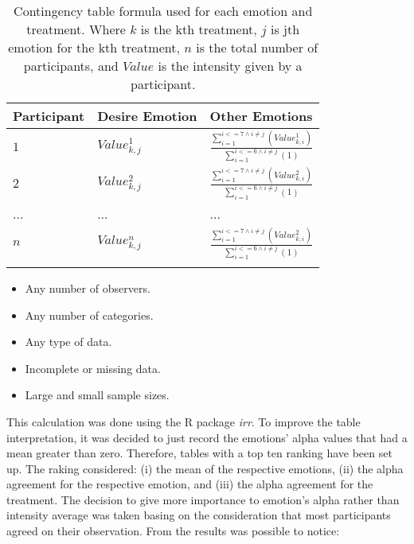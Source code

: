 \begin{table}
\caption{Contingency table formula used for each emotion and treatment. Where $k$ is the kth treatment, $j$ is jth emotion for the kth treatment, $n$ is the total number of participants, and $Value$ is the intensity given by a participant.}
\label{table:table_contingency}
\small
\begin{tabular}{|l|l|l|}
\hline
Participant & Desire Emotion & Other Emotions \\
\hline
$1$ & $Value_{k,j}^{1}$  & $\frac{\sum_{i=1}^{i<=7 \wedge i \neq j}(Value_{k,i}^{1})}{\sum_{i=1}^{i<=6 \wedge i \neq j}(1)}$\\
\hline
$2$ & $Value_{k,j}^{2}$ & $\frac{\sum_{i=1}^{i<=7 \wedge i \neq j}(Value_{k,i}^{2})}{\sum_{i=1}^{i<=6 \wedge i \neq j}(1)}$\\
\hline
... & ... & ...\\
\hline
$n$ & $Value_{k,j}^{n}$ & $\frac{\sum_{i=1}^{i<=7 \wedge i \neq j}(Value_{k,i}^{2})}{\sum_{i=1}^{i<=6 \wedge i \neq j}(1)}$\\
\hline
\multicolumn{3}{c}{}
\end{tabular}
\end{table}

\begin{itemize}
	
	\item Any number of observers.

	\item Any number of categories.

	\item Any type of data.

	\item Incomplete or missing data.

	\item Large and small sample sizes.
\end{itemize}

This calculation was done using the R package \textit{irr}. To improve the table interpretation, it was decided to just record the emotions' alpha values that had a mean greater than zero. Therefore, tables with a top ten ranking have been set up. The raking considered: (i) the mean of the respective emotions, (ii) the alpha agreement for the respective emotion, and (iii) the alpha agreement for the treatment. The decision to give more importance to emotion's alpha rather than intensity average was taken basing on the consideration that most participants agreed on their observation. From the results was possible to notice:

